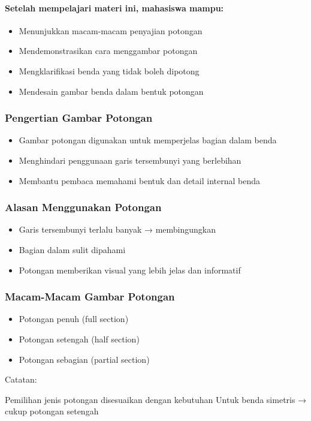 \documentclass[../gbr_teknik.tex]{subfiles}
\begin{document}
\begin{frame}[mytitle=center,c,mybg=bglight1,light]

	\framesubtitle{Setelah mempelajari materi ini, mahasiswa mampu:}

	\begin{itemize}
		\item Menunjukkan macam-macam penyajian potongan
		\item Mendemonstrasikan cara menggambar potongan
		\item Mengklarifikasi benda yang tidak boleh dipotong
		\item Mendesain gambar benda dalam bentuk potongan
	\end{itemize}\end{frame}


\begin{frame}[mytitle=center,t,mybg=bglight2,light]\frametitle{Pengertian Gambar Potongan}

	\begin{itemize}
		\item Gambar potongan digunakan untuk memperjelas bagian dalam benda
		\item Menghindari penggunaan garis tersembunyi yang berlebihan
		\item Membantu pembaca memahami bentuk dan detail internal benda
	\end{itemize}\end{frame}


\begin{frame}[mytitle=standard,t,mybg=bglight3,light]\frametitle{Alasan Menggunakan Potongan}

	\begin{itemize}
		\item Garis tersembunyi terlalu banyak → membingungkan
		\item Bagian dalam sulit dipahami
		\item Potongan memberikan visual yang lebih jelas dan informatif
	\end{itemize}\end{frame}


\begin{frame}[mytitle=standard,c,mycolor=digiPH_uniblue,light]\frametitle{Macam-Macam Gambar Potongan}
	\begin{itemize}
		\item Potongan penuh (full section)
		\item Potongan setengah (half section)
		\item Potongan sebagian (partial section)
	\end{itemize}

	\scriptsize
	\begin{center}
		Catatan:

		Pemilihan jenis potongan disesuaikan dengan kebutuhan
		Untuk benda simetris → cukup potongan setengah
	\end{center}
	\normalsize\end{frame}
\end{document}
